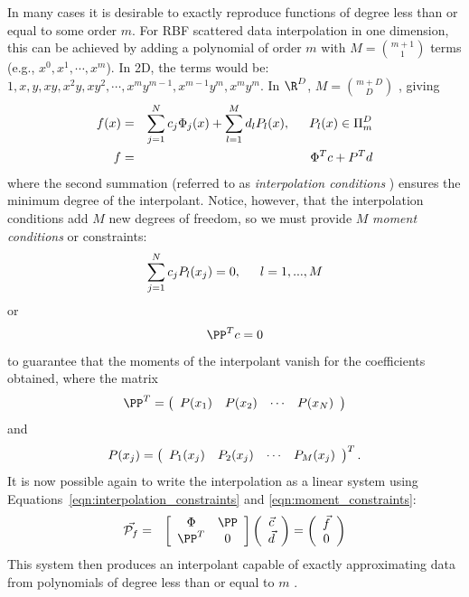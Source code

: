 \documentclass{report}
\begin{document}
{%
In many cases it is desirable to exactly reproduce functions of degree less than or equal to some order $m$. For RBF scattered data interpolation in one dimension, this can be achieved by adding a polynomial of order $m$ with $M =$${m+1}\choose{1}$ terms (e.g., $x^0, x^1, \cdots, x^{m}$). In 2D, the terms would be: $1, x, y, xy, x^2y, xy^2, \cdots, x^{m}y^{m-1}, x^{m-1}y^{m}, x^my^m$. In $\R^D$, $M =$${m+D}\choose{D}$ \cite{Iske:2004}, giving
\begin{eqnarray}
f(x) & = & \sum_{j=1}^{N} c_{j}  \Phi_j(x)  +  \sum_{l=1}^{M} d_{l} P_l(x),  \hskip1.5em  P_l(x) \in \Pi^{D}_{m} \\
f & = & \Phi^T c + P^T d
\label{eqn:interpolation_constraints}
\end{eqnarray}
where the second summation (referred to as \emph{interpolation conditions} \cite{Iske2004}) ensures the minimum degree of the interpolant.  Notice, however, that the interpolation conditions add $M$ new degrees of freedom, so we must provide $M$ \emph{moment conditions} or constraints:
$$
\sum_{j=1}^{N} c_{j} P_l(x_j) = 0,  \hskip1.5em  l=1,..., M 
$$
or 
$$
\PP^T {c}  = {0} 
\label{eqn:moment_constraints}
$$
to guarantee that the moments of the interpolant vanish for the coefficients obtained, where the matrix
$$ \PP^T = \parray{cccc}{P(x_1) & P(x_2) & \cdots & P(x_N)}  $$
and 
$$ P(x_j) = \parray{cccc}{P_1(x_j) & P_2(x_j) & \cdots & P_M(x_j)}^T . $$
It is now possible again to write the interpolation as a linear system using Equations~\ref{eqn:interpolation_constraints} and \ref{eqn:moment_constraints}:%
\begin{eqnarray}
\vec{\mathcal{P}_f} & = & \left[ \begin{array}{c c} 
	\Phi & \PP \\
	\PP^T & 0
	\end{array} \right] \left( \begin{array}{c}
							\vec{c} \\
							\vec{d}
							 \end{array}
						 \right) = \left( \begin{array}{c}
							\vec{f} \\
							0
							 \end{array}
						 \right) 
\end{eqnarray}
This system then produces an interpolant capable of exactly approximating data from polynomials of degree less than or equal to $m$ \cite{Fasshauer2007}. 

}
\end{document}
